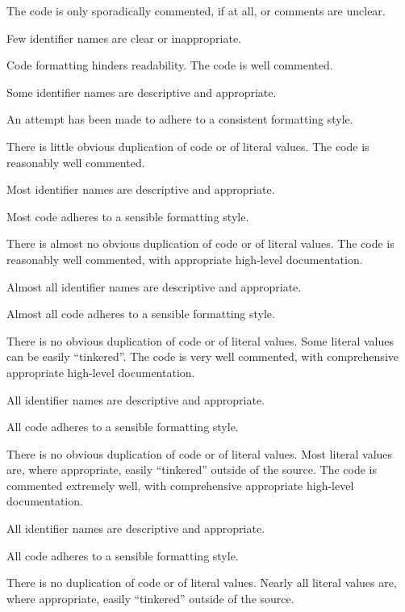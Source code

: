 \documentclass{../../fal_assignment}
\begin{document}
\begin{markingrubric}
        \grade \fail The code is only sporadically commented, if at all, or comments are unclear.
            \par Few identifier names are clear or inappropriate.
            \par Code formatting hinders readability.
        \grade The code is well commented.
            \par Some identifier names are descriptive and appropriate.
            \par An attempt has been made to adhere to a consistent formatting style.
             \par There is little obvious duplication of code or of literal values.           
        \grade The code is reasonably well commented.
            \par Most identifier names are descriptive and appropriate.
            \par Most code adheres to a sensible formatting style.
             \par There is almost no obvious duplication of code or of literal values.   
        \grade The code is reasonably well commented, with appropriate high-level documentation.
            \par Almost all identifier names are descriptive and appropriate.
            \par Almost all code adheres to a sensible formatting style.
             \par There is no obvious duplication of code or of literal values. Some literal values can be easily ``tinkered''. 
        \grade The code is very well commented, with comprehensive appropriate high-level documentation.
            \par All identifier names are descriptive and appropriate.
            \par All code adheres to a sensible formatting style.
             \par There is no obvious duplication of code or of literal values. Most literal values are, where appropriate, easily ``tinkered'' outside of the source.  
        \grade The code is commented extremely well, with comprehensive appropriate high-level documentation.
            \par All identifier names are descriptive and appropriate.
            \par All code adheres to a sensible formatting style.
            \par There is no duplication of code or of literal values. Nearly all literal values are, where appropriate, easily ``tinkered'' outside of the source.  

\end{markingrubric}
\end{document}
